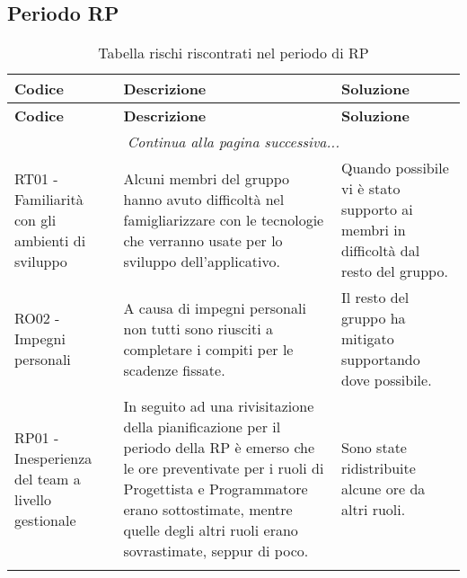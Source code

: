 \documentclass[../piano_di_progetto.tex]{subfiles}
\begin{document}
\subsection{Periodo RP}
\label{sub:rischi_rp}
\begin{center}
	\begin{longtable}{|p{4cm}|p{6cm}|p{6cm}|}
		\hline
		\rowcolor{lightgray}
		{\textbf{Codice}} & {\textbf{Descrizione}} & {\textbf{Soluzione}} \\
		\hline
		\endfirsthead
	
		\hline
		\rowcolor{lightgray}
		{\textbf{Codice}} & {\textbf{Descrizione}} & {\textbf{Soluzione}} \\
		\hline
		\endhead
		
		\hline
		\multicolumn{3}{|c|}{\emph{Continua alla pagina successiva...}}\\
		\hline
		\endfoot

		\endlastfoot
        RT01 - Familiarità con gli ambienti di sviluppo
        & Alcuni membri del gruppo hanno avuto difficoltà nel famigliarizzare con le tecnologie che verranno usate per lo sviluppo dell'applicativo.
        & Quando possibile vi è stato supporto ai membri in difficoltà dal resto del gruppo. \\

        RO02 - Impegni personali
        & A causa di impegni personali non tutti sono riusciti a completare i compiti per le scadenze fissate.
        & Il resto del gruppo ha mitigato supportando dove possibile. \\

        RP01 - Inesperienza del team a livello gestionale
        & In seguito ad una rivisitazione della pianificazione per il periodo della RP è emerso che le ore preventivate per i ruoli di Progettista e Programmatore erano sottostimate, mentre quelle degli altri ruoli erano sovrastimate, seppur di poco.
        & Sono state ridistribuite alcune ore da altri ruoli. \\
        \hline
		\rowcolor{white}
		\caption{Tabella rischi riscontrati nel periodo di RP}
	\end{longtable}

\end{center}
\end{document}
